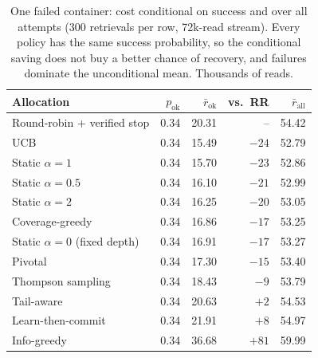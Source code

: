 \begin{table}[!t]
\centering
\caption{One failed container: cost conditional on success and over all attempts (300 retrievals per row, 72k-read stream).  Every policy has the same success probability, so the conditional saving does not buy a better chance of recovery, and failures dominate the unconditional mean.  Thousands of reads.}
\label{tab:uncond}
\scriptsize
\begin{tabular}{@{}lrrrr@{}}
\toprule
Allocation & $p_{\text{ok}}$ & $\bar r_{\text{ok}}$ & vs.\ RR & $\bar r_{\text{all}}$ \\
\midrule
Round-robin + verified stop & 0.34 & 20.31 & -- & 54.42 \\
UCB & 0.34 & 15.49 & $-24$ & 52.79 \\
Static $\alpha{=}1$ & 0.34 & 15.70 & $-23$ & 52.86 \\
Static $\alpha{=}0.5$ & 0.34 & 16.10 & $-21$ & 52.99 \\
Static $\alpha{=}2$ & 0.34 & 16.25 & $-20$ & 53.05 \\
Coverage-greedy & 0.34 & 16.86 & $-17$ & 53.25 \\
Static $\alpha{=}0$ (fixed depth) & 0.34 & 16.91 & $-17$ & 53.27 \\
Pivotal & 0.34 & 17.30 & $-15$ & 53.40 \\
Thompson sampling & 0.34 & 18.43 & $-9$ & 53.79 \\
Tail-aware & 0.34 & 20.63 & $+2$ & 54.53 \\
Learn-then-commit & 0.34 & 21.91 & $+8$ & 54.97 \\
Info-greedy & 0.34 & 36.68 & $+81$ & 59.99 \\
\bottomrule
\end{tabular}
\end{table}
